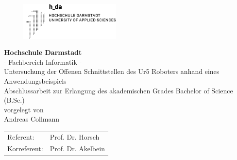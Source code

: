 \begin{titlepage}
 	  \centering
 		\begin{figure}[h]
 			\centering
 				\includegraphics[width=0.45\textwidth]{pic/h_da.png}
 			\label{fig:innoq}
 		\end{figure}	 
 		\zab {2cm}
 		\textbf{\Large Hochschule Darmstadt} \\		 
 		{\Large - Fachbereich Informatik -} \\ 		 
 		\zab {3cm}
 		{\large Untersuchung der Offenen Schnittstellen des Ur5 Roboters anhand eines Anwendungsbeispiels} \\
 		\zab {2cm}
 		Abschlussarbeit zur Erlangung des akademischen Grades Bachelor of Science
 		(B.Sc.)  \\	 
 		\zab {1cm}
 		vorgelegt von \\
 		\zab {1cm}
 		{\Large Andreas Collmann} \\ 
 		\zab {2cm}
 		\begin{tabular}{ll}
 		    Referent: & Prof. Dr. Horsch\\
 		    Korreferent: & Prof. Dr. Akelbein\\
 		\end{tabular}
\end{titlepage}